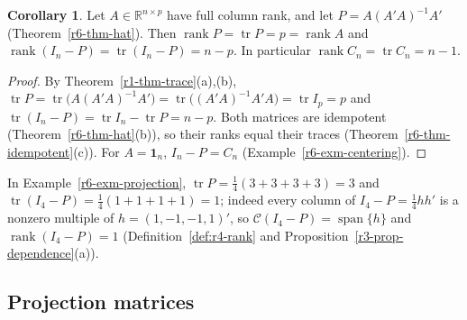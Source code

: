 \documentclass[12pt]{article}
\newcommand{\R}{\mathbb R}
\newcommand{\one}{\mathbf 1}
\DeclareMathOperator{\tr}{tr}
\DeclareMathOperator{\rank}{rank}
\DeclareMathOperator{\Span}{span}
\theoremstyle{definition}
\newtheorem{corollary}[theorem]{Corollary}
\begin{document}
\begin{corollary}\label{r6-cor-trace-hat}
Let \(A\in\R^{n\times p}\) have full column rank, and let \(P=A(A'A)^{-1}A'\) (Theorem~\ref{r6-thm-hat}). Then
\(\rank P=\tr P=p=\rank A\) and \(\rank(I_n-P)=\tr(I_n-P)=n-p\). In particular \(\rank C_n=\tr C_n=n-1\).
\end{corollary}
\begin{proof}
By Theorem~\ref{r1-thm-trace}(a),(b),
\(\tr P=\tr\bigl(A(A'A)^{-1}A'\bigr)=\tr\bigl((A'A)^{-1}A'A\bigr)=\tr I_p=p\) and \(\tr(I_n-P)=\tr I_n-\tr P=n-p\).
Both matrices are idempotent (Theorem~\ref{r6-thm-hat}(b)), so their ranks equal their traces
(Theorem~\ref{r6-thm-idempotent}(c)). For \(A=\one_n\), \(I_n-P=C_n\) (Example~\ref{r6-exm-centering}).
\end{proof}
In Example~\ref{r6-exm-projection}, \(\tr P=\frac14(3+3+3+3)=3\) and \(\tr(I_4-P)=\frac14(1+1+1+1)=1\); indeed every
column of \(I_4-P=\frac14hh'\) is a nonzero multiple of \(h=(1,-1,-1,1)'\), so \(\mathcal C(I_4-P)=\Span\{h\}\) and
\(\rank(I_4-P)=1\) (Definition~\ref{def:r4-rank} and Proposition~\ref{r3-prop-dependence}(a)).

\subsection*{Projection matrices}
\end{document}
